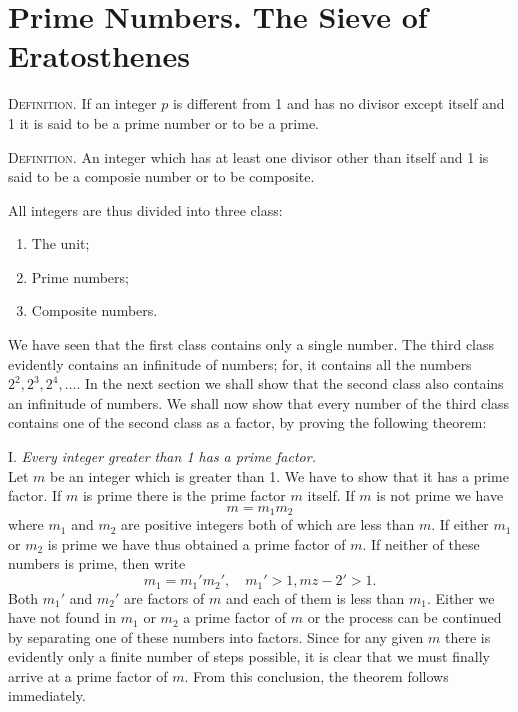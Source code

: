 \documentclass[oneside,12pt]{book}
\begin{document}
\section{Prime Numbers. The Sieve of Eratosthenes}
\textsc{Definition.} If an integer $p$ is different from 1 and has no divisor except itself and 1 it is said to be a prime number or to be a prime. \par 

\textsc{Definition.} An integer which has at least one divisor other than itself and 1 is said to be a composie number or to be composite. \par 

All integers are thus divided into three class:
\begin{enumerate}
    \item The unit;
    \item Prime numbers;
    \item Composite numbers.
\end{enumerate} \par 

We have seen that the first class contains only a single number. The third class evidently contains an infinitude of numbers; for, it contains all the numbers $2^2,2^3,2^4,\dots$. In the next section we shall show that the second class also contains an infinitude of numbers. We shall now show that every number of the third class contains one of the second class as a factor, by proving the following theorem: \par 

I. \textit{Every integer greater than 1 has a prime factor.}\\
\indent Let $m$ be an integer which is greater than 1. We have to show that it has a prime factor. If $m$ is prime there is the prime factor $m$ itself. If $m$ is not prime we have 
$$m=m_1m_2$$
where $m_1$ and $m_2$ are positive integers both of which are less than $m$. If either $m_1$ or $m_2$ is prime we have thus obtained a prime factor of $m$. If neither of these numbers is prime, then write
$$m_1=m_1'm_2',\quad m_1'>1,mz-2'>1.$$
Both $m_1'$ and $m_2'$ are factors of $m$ and each of them is less than $m_1$. Either we have not found in $m_1$ or $m_2$ a prime factor of $m$ or the process can be continued by separating one of these numbers into factors. Since for any given $m$ there is evidently only a finite number of steps possible, it is clear that we must finally arrive at a prime factor of $m$. From this conclusion, the theorem follows immediately. \par 
\end{document}

